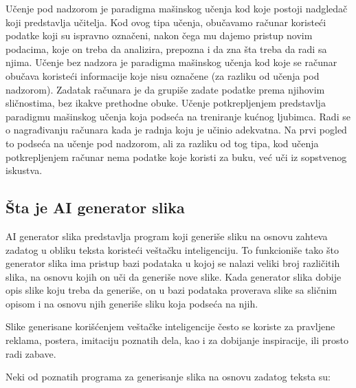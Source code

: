 \documentclass[12pt, letterpaper]{article}
\begin{document}
  

Učenje pod nadzorom je paradigma mašinskog učenja kod koje postoji nadgledač koji predstavlja učitelja. Kod ovog tipa učenja, obučavamo računar koristeći podatke koji su ispravno označeni, nakon čega mu dajemo pristup novim podacima, koje on treba da analizira, prepozna i da zna šta treba da radi sa njima. Učenje bez nadzora je paradigma mašinskog učenja kod koje se računar obučava koristeći informacije koje nisu označene (za razliku od učenja pod nadzorom). Zadatak računara je da grupiše zadate podatke prema njihovim sličnostima, bez ikakve prethodne obuke. Učenje potkrepljenjem predstavlja paradigmu mašinskog učenja koja podseća na treniranje kućnog ljubimca. Radi se o nagrađivanju računara kada je radnja koju je učinio adekvatna. Na prvi pogled to podseća na učenje pod nadzorom, ali za razliku od tog tipa, kod učenja potkrepljenjem računar nema podatke koje koristi za buku, već uči iz sopstvenog iskustva. \cite{kljucDva} 

  

\subsection*{Šta je AI generator slika} 

AI generator slika predstavlja program koji generiše sliku na osnovu zahteva zadatog u obliku teksta koristeći veštačku inteligenciju. To funkcioniše tako što generator slika ima pristup bazi podataka u kojoj se nalazi veliki broj različitih slika, na osnovu kojih on uči da generiše nove slike. Kada generator slika dobije opis slike koju treba da generiše, on u bazi podataka proverava slike sa sličnim opisom i na osnovu njih generiše sliku koja podseća na njih.  

  

Slike generisane korišćenjem veštačke inteligencije često se koriste za pravljene reklama, postera, imitaciju poznatih dela, kao i za dobijanje inspiracije, ili prosto radi zabave.  

  

Neki od poznatih programa za generisanje slika na osnovu zadatog teksta su: 
\end{document}
